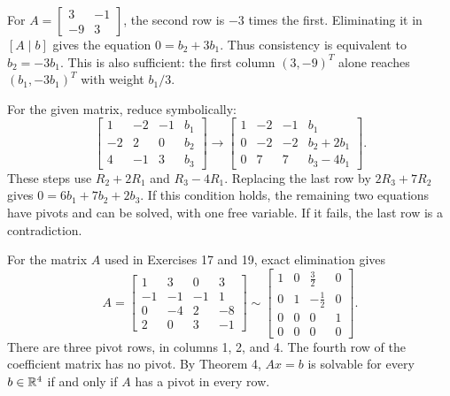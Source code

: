 For $A=\begin{bmatrix}3&-1\\-9&3\end{bmatrix}$,
the second row is $-3$ times the first. Eliminating it in $[A\mid b]$
gives the equation $0=b_2+3b_1$. Thus consistency is equivalent to
$b_2=-3b_1$. This is also sufficient: the first column
$(3,-9)^T$ alone reaches $(b_1,-3b_1)^T$ with weight $b_1/3$.

For the given matrix, reduce symbolically:
\[\left[\begin{array}{rrr|r}1&-2&-1&b_1\\-2&2&0&b_2\\4&-1&3&b_3\end{array}\right]
\longrightarrow
\left[\begin{array}{rrr|r}1&-2&-1&b_1\\0&-2&-2&b_2+2b_1\\0&7&7&b_3-4b_1\end{array}\right].\]
These steps use $R_2+2R_1$ and $R_3-4R_1$. Replacing the last row by
$2R_3+7R_2$ gives $0=6b_1+7b_2+2b_3$.
If this condition holds, the remaining two equations have pivots and
can be solved, with one free variable. If it fails, the last row is a
contradiction.

For the matrix $A$ used in Exercises 17 and 19, exact elimination gives
\[A=\left[\begin{matrix}1 & 3 & 0 & 3\\-1 & -1 & -1 & 1\\0 & -4 & 2 & -8\\2 & 0 & 3 & -1\end{matrix}\right]\sim\left[\begin{matrix}1 & 0 & \frac{3}{2} & 0\\0 & 1 & - \frac{1}{2} & 0\\0 & 0 & 0 & 1\\0 & 0 & 0 & 0\end{matrix}\right].\]
There are three pivot rows, in columns 1, 2, and 4. The fourth row
of the coefficient matrix has no pivot.
By Theorem 4, $Ax=b$ is solvable for every $b\in\mathbb{R}^4$ if and only
if $A$ has a pivot in every row.

